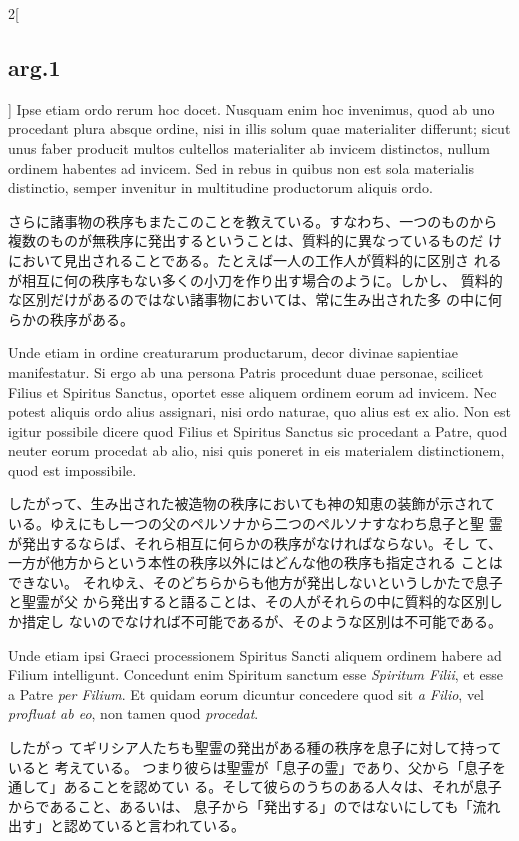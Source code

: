 \documentclass[paper=a4paper,fontsize=10pt,jafontsize=9pt,titlepage]{jlreq}
\begin{document}
\begin{paracol}{2}[\subsection{arg.1}]
Ipse etiam ordo rerum hoc
docet. Nusquam enim hoc invenimus, quod ab uno procedant plura absque
ordine, nisi in illis solum quae materialiter differunt; sicut unus
faber producit multos cultellos materialiter ab invicem distinctos,
nullum ordinem habentes ad invicem. Sed in rebus in quibus non est
sola materialis distinctio, semper invenitur in multitudine
productorum aliquis ordo.

\switchcolumn

さらに諸事物の秩序もまたこのことを教えている。すなわち、一つのものから
 複数のものが無秩序に発出するということは、質料的に異なっているものだ
 けにおいて見出されることである。たとえば一人の工作人が質料的に区別さ
 れるが相互に何の秩序もない多くの小刀を作り出す場合のように。しかし、
 質料的な区別だけがあるのではない諸事物においては、常に生み出された多
 の中に何らかの秩序がある。

\switchcolumn*

Unde etiam in ordine creaturarum
productarum, decor divinae sapientiae manifestatur. Si ergo ab una
persona Patris procedunt duae personae, scilicet Filius et 
 Spiritus Sanctus, oportet esse aliquem ordinem eorum ad invicem. Nec
potest aliquis ordo alius assignari, nisi ordo naturae, quo alius est
ex alio. 
Non est igitur possibile dicere quod Filius et 
 Spiritus Sanctus sic procedant a Patre, quod neuter eorum procedat ab
alio, nisi quis poneret in eis materialem distinctionem, quod est
impossibile.

\switchcolumn

したがって、生み出された被造物の秩序においても神の知恵の装飾が示されて
 いる。ゆえにもし一つの父のペルソナから二つのペルソナすなわち息子と聖
 霊が発出するならば、それら相互に何らかの秩序がなければならない。そし
 て、一方が他方からという本性の秩序以外にはどんな他の秩序も指定される
 ことはできない。
それゆえ、そのどちらからも他方が発出しないというしかたで息子と聖霊が父
 から発出すると語ることは、その人がそれらの中に質料的な区別しか措定し
 ないのでなければ不可能であるが、そのような区別は不可能である。

\switchcolumn*

Unde etiam ipsi Graeci processionem  Spiritus Sancti
aliquem ordinem habere ad Filium intelligunt. 
Concedunt enim  Spiritum
sanctum esse  {\itshape Spiritum Filii}, et esse a Patre {\itshape per Filium}. Et quidam
eorum dicuntur concedere quod sit {\itshape a Filio}, vel {\itshape profluat ab eo}, non
tamen quod {\itshape procedat}.

\switchcolumn

したがっ
 てギリシア人たちも聖霊の発出がある種の秩序を息子に対して持っていると
 考えている。
つまり彼らは聖霊が「息子の霊」であり、父から「息子を通して」あることを認めてい
 る。そして彼らのうちのある人々は、それが息子からであること、あるいは、
 息子から「発出する」のではないにしても「流れ出す」と認めていると言われている。


\end{paracol}
\end{document}
